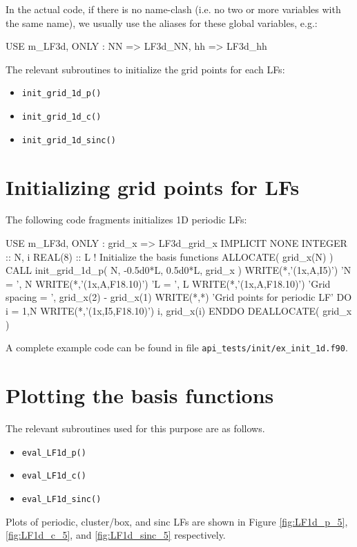 In the actual code, if there is no name-clash (i.e. no two or more variables with the
same name), we usually use the aliases for these global variables, e.g.:
\begin{fortrancode}
USE m_LF3d, ONLY : NN => LF3d_NN, hh => LF3d_hh
\end{fortrancode}

The relevant subroutines to initialize the grid points for each LFs:
\begin{itemize}
\item \texttt{init\_grid\_1d\_p()}
\item \texttt{init\_grid\_1d\_c()}
\item \texttt{init\_grid\_1d\_sinc()}
\end{itemize}



\section{Initializing grid points for LFs}

The following code fragments initializes 1D periodic LFs:
\begin{fortrancode}
USE m_LF3d, ONLY : grid_x => LF3d_grid_x
IMPLICIT NONE
INTEGER :: N, i
REAL(8) :: L
! Initialize the basis functions
ALLOCATE( grid_x(N) )
CALL init_grid_1d_p( N, -0.5d0*L, 0.5d0*L, grid_x )
WRITE(*,'(1x,A,I5)') 'N = ', N
WRITE(*,'(1x,A,F18.10)') 'L = ', L
WRITE(*,'(1x,A,F18.10)') 'Grid spacing = ', grid_x(2) - grid_x(1)
WRITE(*,*) 'Grid points for periodic LF'
DO i = 1,N
  WRITE(*,'(1x,I5,F18.10)') i, grid_x(i)
ENDDO
DEALLOCATE( grid_x )
\end{fortrancode}

A complete example code can be found in file \texttt{api\_tests/init/ex\_init\_1d.f90}.


\section{Plotting the basis functions}

The relevant subroutines used for this purpose are as follows.
\begin{itemize}
\item \texttt{eval\_LF1d\_p()}
\item \texttt{eval\_LF1d\_c()}
\item \texttt{eval\_LF1d\_sinc()}
\end{itemize}

Plots of periodic, cluster/box, and sinc LFs are
shown in Figure \ref{fig:LF1d_p_5}, \ref{fig:LF1d_c_5}, and
\ref{fig:LF1d_sinc_5} respectively.

